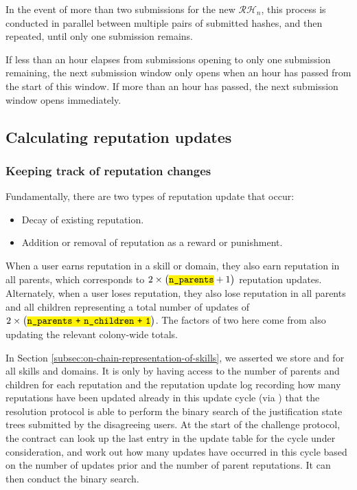 In the event of more than two submissions for the new $\mathcal{RH}_n$, this process is conducted in parallel between multiple pairs of submitted hashes, and then repeated, until only one submission remains.

If less than an hour elapses from submissions opening to only one submission remaining, the next submission window only opens when an hour has passed from the start of this window. If more than an hour has passed, the next submission window opens immediately.

\subsection{Calculating reputation updates}\label{sec:calculating-reputation-updates}
%
\subsubsection{Keeping track of reputation changes}
%
Fundamentally, there are two types of reputation update that occur:
\begin{itemize}
 \item Decay of existing reputation.
 \item Addition or removal of reputation as a reward or punishment.
\end{itemize}

When a user earns reputation in a skill or domain, they also earn reputation in all parents, which corresponds to $2\times\left(\ascode{n\_parents}+1\right)$ reputation updates. Alternately, when a user loses reputation, they also lose reputation in all parents and all children representing a total number of updates of $2\times\left(\ascode{n\_parents + n\_children + 1}\right)$. The factors of two here come from also updating the relevant colony-wide totals.

In Section \ref{subsec:on-chain-representation-of-skills}, we asserted we store  and  for all skills and domains. It is only by having access to the number of parents and children for each reputation and the reputation update log recording how many reputations have been updated already in this update cycle (via ) that the resolution protocol is able to perform the binary search of the justification state trees submitted by the disagreeing users. At the start of the challenge protocol, the contract can look up the last entry in the update table for the cycle under consideration, and work out how many updates have occurred in this cycle based on the number of updates prior and the number of parent reputations. It can then conduct the binary search.

